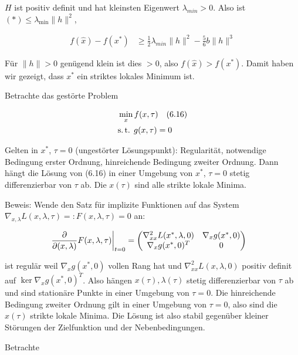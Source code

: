 $H$ ist positiv definit und hat kleinsten Eigenwert $\lambda_{min} > 0$. Also ist $(*) \leq \lambda_{\min} \|h\|^2$,

\begin{align*}
f(\hat x) - f(x^*) & \geq \frac 12 \lambda_{min} \|h\|^2 - \frac 56 b \|h\|^3
\end{align*}

Für $\|h\| > 0$ genügend klein ist dies $>0$, also $f(\hat x) > f(x^*)$. Damit haben wir gezeigt, dass $x^*$ ein striktes lokales Minimum ist.


Betrachte das gestörte Problem

\begin{align*}
&\min_x f(x, \tau) \quad (6.16) \\
&\text{s.\,t. } g(x,\tau) = 0 \\
\end{align*}

Gelten in $x^*$, $\tau = 0$ (ungestörter Lösungspunkt): Regularität, notwendige Bedingung erster Ordnung, hinreichende Bedingung zweiter Ordnung. Dann hängt die Lösung von (6.16) in einer Umgebung von $x^*$, $\tau=0$ stetig differenzierbar von $\tau$ ab. Die $x(\tau)$ sind alle strikte lokale Minima.

Beweis: Wende den Satz für implizite Funktionen auf das System $\nabla_{x,\lambda} L(x,\lambda,\tau) =: F(x,\lambda,\tau)=0$ an:

\begin{align*}
\left. \frac{\partial}{\partial (x,\lambda)} F(x,\lambda,\tau) \right|_{t=0} &= \begin{pmatrix} \nabla_{xx}^2 L(x^*,\lambda,0) & \nabla_x g(x^*, 0) \\ \nabla_x g(x^*, 0)^T & 0 \end{pmatrix}
\end{align*}

ist regulär weil $\nabla_x g(x^*, 0)$ vollen Rang hat und $\nabla_{xx}^2 L(x,\lambda,0)$ positiv definit auf $\ker \nabla_x g(x^*,0)^T$. Also hängen $x(\tau), \lambda(\tau)$ stetig differenzierbar von $\tau$ ab und sind stationäre Punkte in einer Umgebung von $\tau=0$. Die hinreichende Bedingung zweiter Ordnung gilt in einer Umgebung von $\tau=0$, also sind die $x(\tau)$ strikte lokale Minima. Die Lösung ist also stabil gegenüber kleiner Störungen der Zielfunktion und der Nebenbedingungen.



Betrachte

